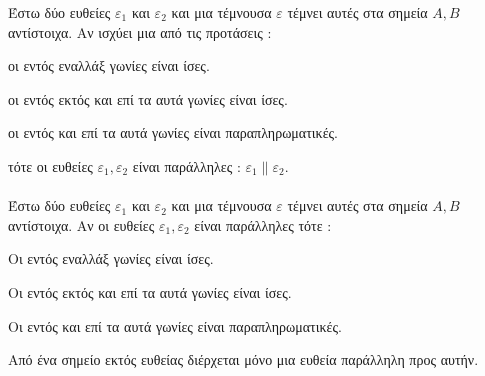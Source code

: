\documentclass[twoside,nofonts,ektypwsh,shmeiwseis]{thewria}
\begin{document}
\thewrhmata
{}
Έστω δύο ευθείες $ \varepsilon_1 $ και $ \varepsilon_2 $ και μια τέμνουσα $ \varepsilon $ τέμνει αυτές στα σημεία $ A,B $ αντίστοιχα. Αν ισχύει μια από τις προτάσεις :
\begin{rlist}
\item οι εντός εναλλάξ γωνίες είναι ίσες.
\item οι εντός εκτός και επί τα αυτά γωνίες είναι ίσες.
\item οι εντός και επί τα αυτά γωνίες είναι παραπληρωματικές.
\end{rlist}
τότε οι ευθείες $ \varepsilon_1,\varepsilon_2 $ είναι παράλληλες : $ \varepsilon_1\parallel\varepsilon_2 $.\\\\
Έστω δύο ευθείες $ \varepsilon_1 $ και $ \varepsilon_2 $ και μια τέμνουσα $ \varepsilon $ τέμνει αυτές στα σημεία $ A,B $ αντίστοιχα. Αν οι ευθείες $ \varepsilon_1,\varepsilon_2 $ είναι παράλληλες τότε :
\begin{rlist}
\item Οι εντός εναλλάξ γωνίες είναι ίσες.
\item Οι εντός εκτός και επί τα αυτά γωνίες είναι ίσες.
\item Οι εντός και επί τα αυτά γωνίες είναι παραπληρωματικές.
\end{rlist}
Από ένα σημείο εκτός ευθείας διέρχεται μόνο μια ευθεία παράλληλη προς αυτήν.\\\\
\mbox{}\\\\\\
\end{document}
